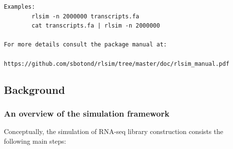 \begin{verbatim}
Examples:
        rlsim -n 2000000 transcripts.fa
        cat transcripts.fa | rlsim -n 2000000

For more details consult the package manual at:
        https://github.com/sbotond/rlsim/tree/master/doc/rlsim_manual.pdf
\end{verbatim}

\subsection{Background}

\subsubsection{An overview of the simulation framework}
\label{sss:framework}

Conceptually, the simulation of RNA-seq library construction consists the following main steps:

